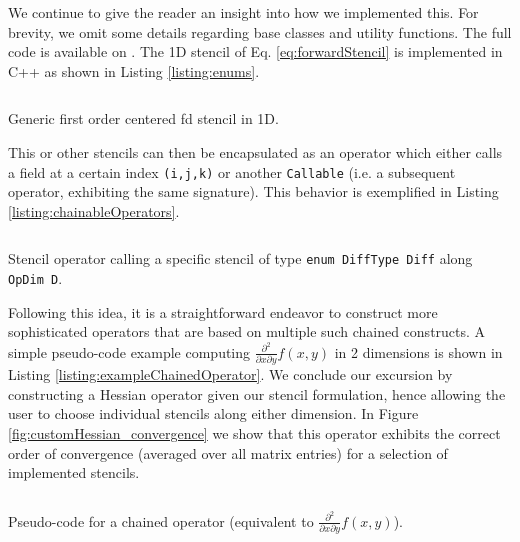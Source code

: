 We continue to give the reader an insight into how we implemented this. For brevity, we
omit some details regarding base classes and utility functions. The full code is available on
\cite{tobiaStudentRepo}.
The 1D stencil of Eq. \ref{eq:forwardStencil} is implemented in C++ as shown in Listing \ref{listing:enums}. 

\begin{listing}[!ht]
    \vspace{3.3mm}
    \inputminted[]{c++}{code_snippets/diffOperator/enums.cpp}
    \caption{Generic first order centered \gls{fd} stencil in 1D.}
\label{listing:enums}
\end{listing}

This or other stencils can then be encapsulated as an operator which either calls a field at a certain index
\texttt{(i,j,k)} or another \texttt{Callable} (i.e. a subsequent operator, exhibiting the same
signature). This behavior is exemplified in Listing \ref{listing:chainableOperators}.

\begin{listing}[!ht]
    \vspace{3.3mm}
    \inputminted[]{c++}{code_snippets/diffOperator/stencils.cpp}
    \caption{Stencil operator calling a specific stencil of type \texttt{enum
DiffType Diff} along \texttt{OpDim D}.}
\label{listing:chainableOperators}
\end{listing}

Following this idea, it is a straightforward endeavor to construct more sophisticated operators that
are based on multiple such chained constructs.
A simple pseudo-code example computing $\frac{\partial^2}{\partial x \partial y} f(x,y)$ in 2
dimensions is shown in Listing \ref{listing:exampleChainedOperator}.
We conclude our excursion by constructing a Hessian operator given our
stencil formulation, hence allowing the user to choose individual stencils along either dimension.
In Figure \ref{fig:customHessian_convergence} we show that this operator exhibits the correct order
of convergence (averaged over all matrix entries) for a selection of implemented stencils.

\begin{listing}[!ht]
    \vspace{3.3mm}
    \inputminted[]{c++}{code_snippets/diffOperator/chainableOperator.cpp}
    \caption{Pseudo-code for a chained operator (equivalent to $\frac{\partial^2}{\partial x
    \partial y} f(x,y)$).}
\label{listing:exampleChainedOperator}
\end{listing}

